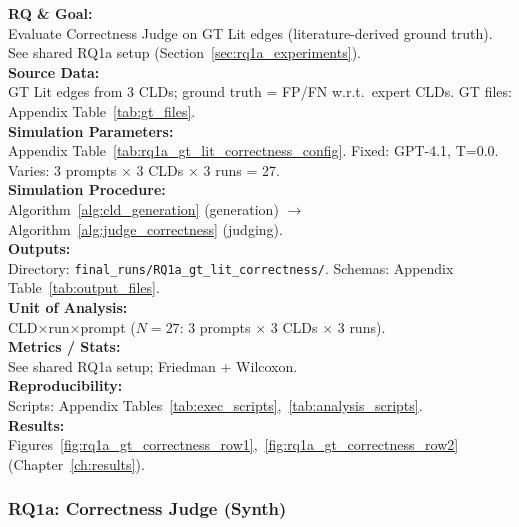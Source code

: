 \textbf{RQ \& Goal:}\\
Evaluate Correctness Judge on GT Lit edges (literature-derived ground truth). See shared RQ1a setup (Section~\ref{sec:rq1a_experiments}).\\
\textbf{Source Data:}\\
GT Lit edges from 3 CLDs; ground truth = FP/FN w.r.t.\ expert CLDs. GT files: Appendix Table~\ref{tab:gt_files}.\\
\textbf{Simulation Parameters:}\\
Appendix Table~\ref{tab:rq1a_gt_lit_correctness_config}. Fixed: GPT-4.1, T=0.0. Varies: 3 prompts $\times$ 3 CLDs $\times$ 3 runs = 27.\\
\textbf{Simulation Procedure:}\\
Algorithm~\ref{alg:cld_generation} (generation) $\rightarrow$ Algorithm~\ref{alg:judge_correctness} (judging).\\
\textbf{Outputs:}\\
Directory: \texttt{final\_runs/RQ1a\_gt\_lit\_correctness/}. Schemas: Appendix Table~\ref{tab:output_files}.\\
\textbf{Unit of Analysis:}\\
CLD$\times$run$\times$prompt ($N=27$: 3 prompts $\times$ 3 CLDs $\times$ 3 runs).\\
\textbf{Metrics / Stats:}\\
See shared RQ1a setup; Friedman + Wilcoxon.\\
\textbf{Reproducibility:}\\
Scripts: Appendix Tables~\ref{tab:exec_scripts},~\ref{tab:analysis_scripts}.\\
\textbf{Results:}\\
Figures~\ref{fig:rq1a_gt_correctness_row1},~\ref{fig:rq1a_gt_correctness_row2} (Chapter~\ref{ch:results}).

\subsubsection{RQ1a: Correctness Judge (Synth)}
\label{sec:rq1a_correctness_synth}

